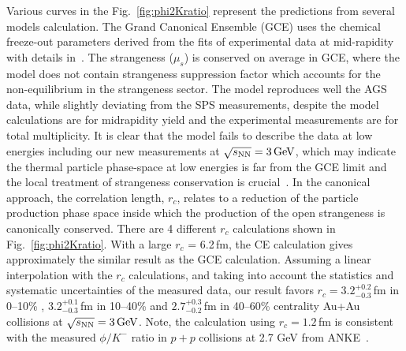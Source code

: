 \documentclass[%
 reprint,	
showpacs,
 amsmath,amssymb,
 aps,
 prc,
]{revtex4-1}
\begin{document}
Various curves in the Fig.~\ref{fig:phi2Kratio} represent the predictions from several models calculation. The Grand Canonical Ensemble (GCE) uses the chemical freeze-out parameters derived from the fits of experimental data at mid-rapidity with details in~\cite{ANDRONIC2006167_SHM}. The strangeness ($\mu_s$) is conserved on average in GCE, where the model does not contain strangeness suppression factor which accounts for the non-equilibrium in the strangeness sector. The model reproduces well the AGS data, while slightly deviating from the SPS measurements, despite the model calculations are for midrapidity yield and the experimental measurements are for total multiplicity. It is clear that the model fails to describe the data at low energies including our new measurements at ${\sqrt{s_{\rm NN}} = \rm{3\,GeV}}$, which may indicate the thermal particle phase-space at low energies is far from the GCE limit and the local treatment of strangeness conservation is crucial~\cite{BraunMunzinger:2003zd,Redlich_CE}. In the canonical approach, the correlation length, $r_c$, relates to a reduction of the particle production phase space inside which the production of the open strangeness is canonically conserved. There are 4 different $r_c$ calculations shown in Fig.~\ref{fig:phi2Kratio}. With a large $r_c$ = 6.2\,fm, the CE calculation gives approximately the similar result as the GCE calculation. Assuming a linear interpolation with the $r_c$ calculations, and taking into account the statistics and systematic uncertainties of the measured data, our result favors $r_c = 3.2_{-0.3}^{+0.2}$\,fm in 0--10\% , $3.2_{-0.3}^{+0.1}$\,fm in 10--40\% and $2.7_{-0.2}^{+0.3}$\,fm in 40--60\% centrality Au+Au collisions at ${\sqrt{s_{\rm NN}} = \rm{3\,GeV}}$. Note, the calculation using $r_c = 1.2$\,fm is consistent with the measured $\phi/K^-$ ratio in $p+p$ collisions at 2.7 GeV from ANKE~\cite{ANKE_phi,HADES_phi_ArKCl}. 
\end{document}
